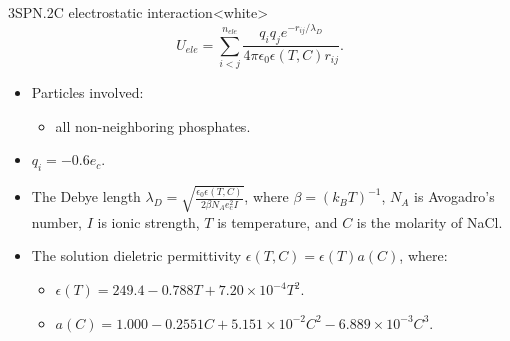 \begin{smallpage}{3SPN.2C electrostatic interaction}<white>
  \begin{equation}
    \label{eq:dna_3spn2c_nonlocal_ele}
    U_{ele} = \sum_{i<j}^{n_{ele}}\frac{q_i q_j e^{-r_{ij}/\lambda_D}}{4\pi \epsilon_0 \epsilon(T, C) r_{ij}}.
  \end{equation}
  \tcblower
  \begin{itemize}
  \item Particles involved:
    \begin{itemize}
    \item all non-neighboring phosphates.
    \end{itemize}
  \item $q_{i} = -0.6 e_c$.
  \item The Debye length $\displaystyle \lambda_D = \sqrt{\frac{\epsilon_0 \epsilon(T, C)}{2\beta
        N_A e_c^2 I}}$, where $\beta=( k_B T )^{-1}$, $N_A$ is Avogadro's
    number, $I$ is ionic strength, $T$ is temperature, and $C$ is the molarity of NaCl.
  \item The solution dieletric permittivity $\displaystyle \epsilon(T, C) = \epsilon(T)a(C)  $, where:
    \begin{itemize}
    \item $\epsilon(T) = 249.4 - 0.788T + 7.20\times10^{-4} T^2 $.
    \item $a(C) = 1.000 - 0.2551 C + 5.151\times10^{-2} C^2 - 6.889\times 10^{-3} C^3 $.
    \end{itemize}
  \end{itemize}
\end{smallpage}
